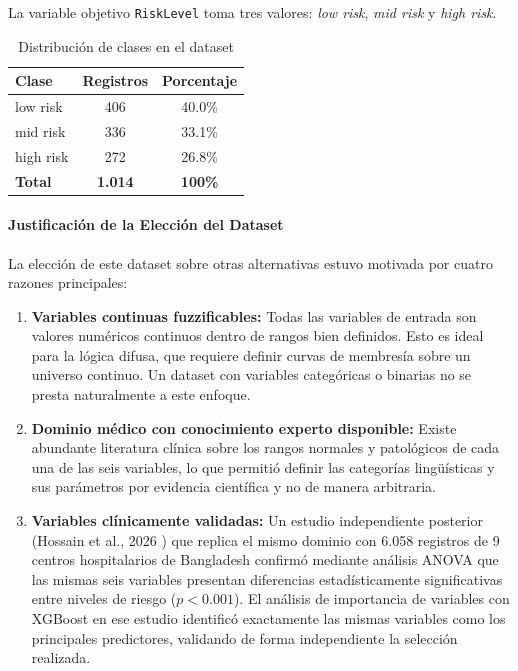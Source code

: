 \documentclass[11pt]{article}
\begin{document}
La variable objetivo \texttt{RiskLevel} toma tres valores: \textit{low risk}, \textit{mid risk} y \textit{high risk}.

\begin{table}[H]
    \centering
    \caption{Distribuci\'on de clases en el dataset}
    \begin{tabular}{lcc}
        \toprule
        \textbf{Clase} & \textbf{Registros} & \textbf{Porcentaje} \\
        \midrule
        low risk       & 406                & 40.0\%              \\
        mid risk       & 336                & 33.1\%              \\
        high risk      & 272                & 26.8\%              \\
        \midrule
        \textbf{Total} & \textbf{1.014}     & \textbf{100\%}      \\
        \bottomrule
    \end{tabular}
    \label{tab:distribucion_clases}
    \par{}
\end{table}

\paragraph{Justificación de la Elección del Dataset}

La elecci\'on de este dataset sobre otras alternativas estuvo motivada por cuatro razones principales:

\begin{enumerate}
    \item \textbf{Variables continuas fuzzificables:} Todas las variables de entrada son valores num\'ericos continuos dentro de rangos bien definidos. Esto es ideal para la l\'ogica difusa, que requiere definir curvas de membres\'ia sobre un universo continuo. Un dataset con variables categ\'oricas o binarias no se presta naturalmente a este enfoque.

    \item \textbf{Dominio m\'edico con conocimiento experto disponible:} Existe abundante literatura cl\'inica sobre los rangos normales y patol\'ogicos de cada una de las seis variables, lo que permiti\'o definir las categor\'ias ling\"u\'isticas y sus par\'ametros por evidencia cient\'ifica y no de manera arbitraria.

    \item \textbf{Variables cl\'inicamente validadas:} Un estudio independiente posterior (Hossain et al., 2026 \cite{hossain2026}) que replica el mismo dominio con 6.058 registros de 9 centros hospitalarios de Bangladesh confirm\'o mediante an\'alisis ANOVA que las mismas seis variables presentan diferencias estad\'isticamente significativas entre niveles de riesgo ($p < 0.001$). El an\'alisis de importancia de variables con XGBoost en ese estudio identific\'o exactamente las mismas variables como los principales predictores, validando de forma independiente la selecci\'on realizada.
\end{enumerate}
\end{document}
